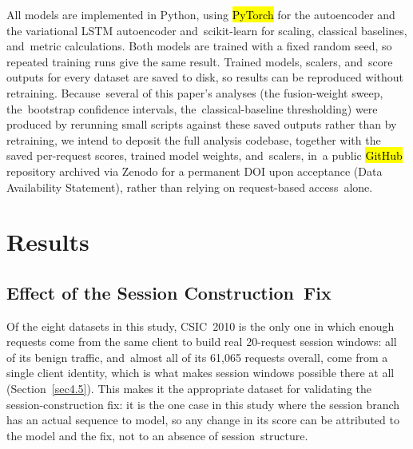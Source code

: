 \documentclass[futureinternet,article,accept,moreauthors]{Definitions/mdpi}
\begin{document}
All models are implemented in Python, using \hl{PyTorch} %
 for the autoencoder and the variational LSTM autoencoder and~scikit-learn for scaling, classical baselines, and~metric calculations. Both models are trained with a fixed random seed, so repeated training runs give the same result. Trained models, scalers, and~score outputs for every dataset are saved to disk, so results can be reproduced without retraining. Because~several of this paper's analyses (the fusion-weight sweep, the~bootstrap confidence intervals, the~classical-baseline thresholding) were produced by rerunning small scripts against these saved outputs rather than by retraining, we intend to deposit the full analysis codebase, together with the saved per-request scores, trained model weights, and~scalers, in~a public \hl{GitHub} %
repository archived via Zenodo for a permanent DOI upon acceptance (Data Availability Statement), rather than relying on request-based access~alone.

\section{Results} \label{sec5}
\unskip

\subsection{Effect of the Session Construction~Fix} \label{sec5.1}

Of the eight datasets in this study, CSIC~2010 is the only one in which enough requests come from the same client to build real 20-request session windows: all of its benign traffic, and~almost all of its 61{,}065 requests overall, come from a single client identity, which is what makes session windows possible there at all (Section~\ref{sec4.5}). This makes it the appropriate dataset for validating the session-construction fix: it is the one case in this study where the session branch has an actual sequence to model, so any change in its score can be attributed to the model and the fix, not to an absence of session~structure.
\end{document}
